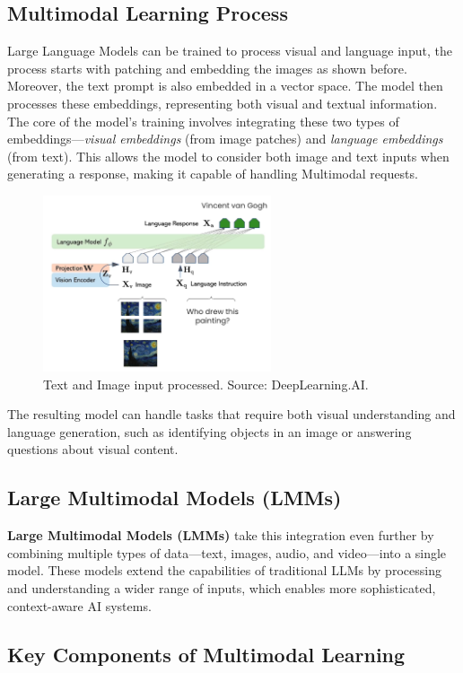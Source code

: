 \subsection{Multimodal Learning Process}
Large Language Models can be trained to process visual and language input, the process starts with patching and embedding the images as shown before. Moreover, the text prompt is also embedded in a vector space. The model then processes these embeddings, representing both visual and textual information. The core of the model’s training involves integrating these two types of embeddings—\textit{visual embeddings} (from image patches) and \textit{language embeddings} (from text). This allows the model to consider both image and text inputs when generating a response, making it capable of handling Multimodal requests.
\begin{figure}[h]
    \centering
    \includegraphics[width=0.6\textwidth]{IMAGES/immagine_2025-02-26_113532424.png}
    \caption[Text and Image input processed]{Text and Image input processed. Source: DeepLearning.AI.\footnotemark[4]}
    \label{fig:InputText}
\end{figure}
The resulting model can handle tasks that require both visual understanding and language generation, such as identifying objects in an image or answering questions about visual content.

\subsection{Large Multimodal Models (LMMs)}
\textbf{Large Multimodal Models (LMMs)} take this integration even further by combining multiple types of data—text, images, audio, and video—into a single model. These models extend the capabilities of traditional LLMs by processing and understanding a wider range of inputs, which enables more sophisticated, context-aware AI systems.

\subsection{Key Components of Multimodal Learning}

